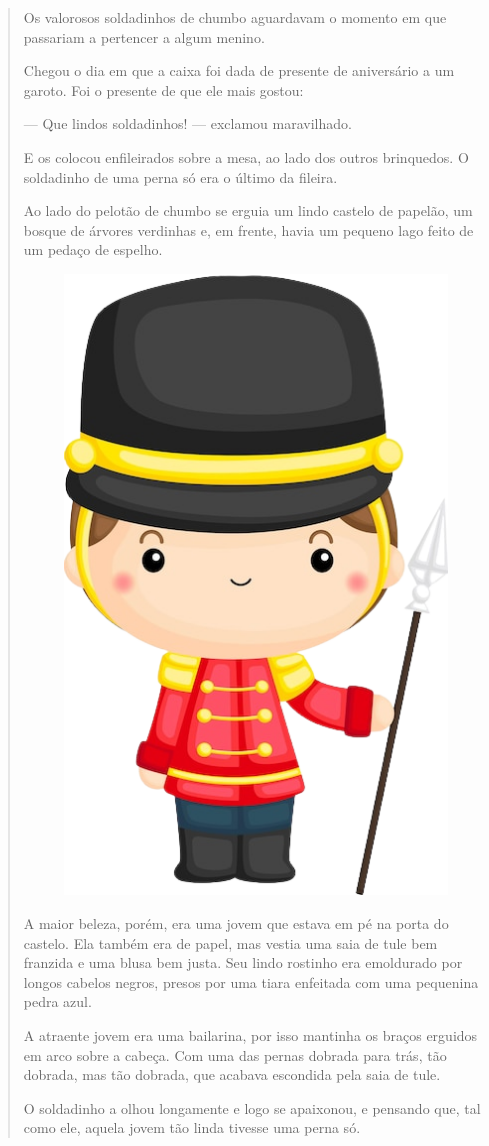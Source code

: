 \begin{conteudo}
\begin{conteudo}
\begin{conteudo}
\begin{conteudo}
\begin{quote}
Os valorosos soldadinhos de chumbo aguardavam o momento em que passariam
a pertencer a algum menino.

Chegou o dia em que a caixa foi dada de presente de aniversário a um
garoto. Foi o presente de que ele mais gostou:

--- Que lindos soldadinhos! --- exclamou maravilhado.

E os colocou enfileirados sobre a mesa, ao lado dos outros brinquedos. O
soldadinho de uma perna só era o último da fileira.

Ao lado do pelotão de chumbo se erguia um lindo castelo de papelão, um
bosque de árvores verdinhas e, em frente, havia um pequeno lago feito de
um pedaço de espelho.

\begin{figure}
\includegraphics[width=.5\textwidth]{media/image24.png}
\end{figure}

A maior beleza, porém, era uma jovem que estava em pé na porta do
castelo. Ela também era de papel, mas vestia uma saia de tule bem
franzida e uma blusa bem justa. Seu lindo rostinho era emoldurado por
longos cabelos negros, presos por uma tiara enfeitada com uma pequenina
pedra azul.

A atraente jovem era uma bailarina, por isso mantinha os braços erguidos
em arco sobre a cabeça. Com uma das pernas dobrada para trás, tão
dobrada, mas tão dobrada, que acabava escondida pela saia de tule.

O soldadinho a olhou longamente e logo se apaixonou, e pensando que, tal
como ele, aquela jovem tão linda tivesse uma perna só.


\end{quote}
\end{conteudo}
\end{conteudo}
\end{conteudo}
\end{conteudo}
